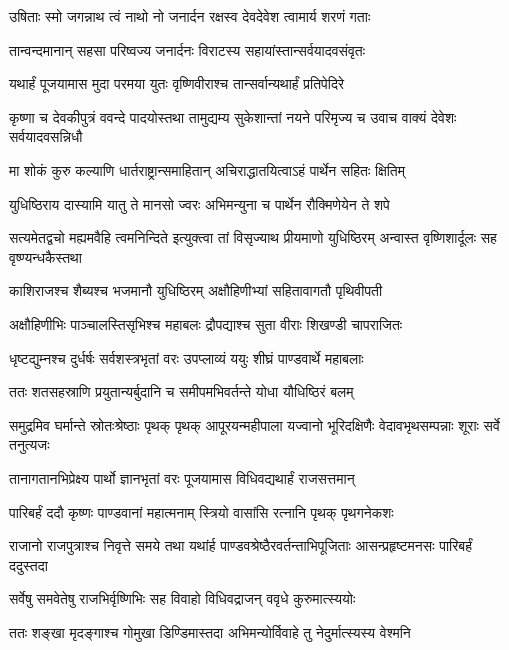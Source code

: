 \twolineshloka
{उषिताः स्मो जगन्नाथ त्वं नाथो नो जनार्दन}
{रक्षस्व देवदेवेश त्वामार्य शरणं गताः}



\twolineshloka
{तान्वन्दमानान् सहसा परिष्वज्य जनार्दनः}
{विराटस्य सहायांस्तान्सर्वयादवसंवृतः}


\twolineshloka
{यथार्हं पूजयामास मुदा परमया युतः}
{वृष्णिवीराश्च तान्सर्वान्यथार्हं प्रतिपेदिरे}


\threelineshloka
{कृष्णा च देवकीपुत्रं ववन्दे पादयोस्तथा}
{तामुद्यम्य सुकेशान्तां नयने परिमृज्य च}
{उवाच वाक्यं देवेशः सर्वयादवसन्निधौ}


\twolineshloka
{मा शोकं कुरु कल्याणि धार्तराष्ट्रान्समाहितान्}
{अचिराद्धातयित्वाऽहं पार्थेन सहितः क्षितिम्}


\twolineshloka
{युधिष्ठिराय दास्यामि यातु ते मानसो ज्वरः}
{अभिमन्युना च पार्थेन रौक्मिणेयेन ते शपे}


\threelineshloka
{सत्यमेतद्वचो मह्यमवैहि त्वमनिन्दिते}
{इत्युक्त्वा तां विसृज्याथ प्रीयमाणो युधिष्ठिरम्}
{अन्वास्त वृष्णिशार्दूलः सह वृष्ण्यन्धकैस्तथा}


\twolineshloka
{काशिराजश्च शैब्यश्च भजमानौ युधिष्ठिरम्}
{अक्षौहिणीभ्यां सहितावागतौ पृथिवीपती}


\twolineshloka
{अक्षौहिणीभिः पाञ्चालस्तिसृभिश्च महाबलः}
{द्रौपद्याश्च सुता वीराः शिखण्डी चापराजितः}


\twolineshloka
{धृष्टद्युम्नश्च दुर्धर्षः सर्वशस्त्रभृतां वरः}
{उपप्लाव्यं ययुः शीघ्रं पाण्डवार्थे महाबलाः}


\twolineshloka
{ततः शतसहस्राणि प्रयुतान्यर्बुदानि च}
{समीपमभिवर्तन्ते योधा यौधिष्ठिरं बलम्}


\threelineshloka
{समुद्रमिव घर्मान्ते स्रोतःश्रेष्ठाः पृथक् पृथक्}
{आपूरयन्महीपाला यज्वानो भूरिदक्षिणैः}
{वेदावभृथसम्पन्नाः शूराः सर्वे तनुत्यजः}


\twolineshloka
{तानागतानभिप्रेक्ष्य पार्थो ज्ञानभृतां वरः}
{पूजयामास विधिवद्यथार्हं राजसत्तमान्}


\twolineshloka
{पारिबर्हं ददौ कृष्णः पाण्डवानां महात्मनाम्}
{स्त्रियो वासांसि रत्नानि पृथक् पृथगनेकशः}


\threelineshloka
{राजानो राजपुत्राश्च निवृत्ते समये तथा}
{यथांर्ह पाण्डवश्रेष्ठैरवर्तन्ताभिपूजिताः}
{आसन्प्रहृष्टमनसः पारिबर्हं ददुस्तदा}


\twolineshloka
{सर्वेषु समवेतेषु राजभिर्वृष्णिभिः सह}
{विवाहो विधिवद्राजन् ववृधे कुरुमात्स्ययोः}


\twolineshloka
{ततः शङ्खा मृदङ्गाश्च गोमुखा डिण्डिमास्तदा}
{अभिमन्योर्विवाहे तु नेदुर्मात्स्यस्य वेश्मनि}


